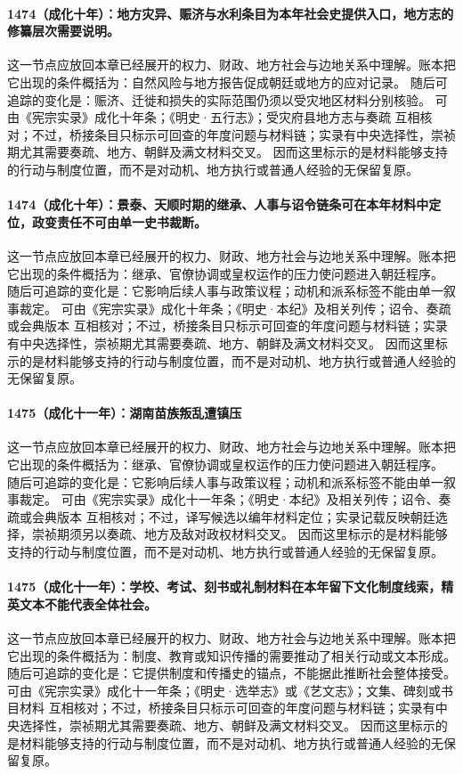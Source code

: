 \paragraph{1474（成化十年）：地方灾异、赈济与水利条目为本年社会史提供入口，地方志的修纂层次需要说明。} 这一节点应放回本章已经展开的权力、财政、地方社会与边地关系中理解。账本把它出现的条件概括为：自然风险与地方报告促成朝廷或地方的应对记录。 随后可追踪的变化是：赈济、迁徙和损失的实际范围仍须以受灾地区材料分别核验。 可由《宪宗实录》成化十年条；《明史·五行志》；受灾府县地方志与奏疏 互相核对；不过，桥接条目只标示可回查的年度问题与材料链；实录有中央选择性，崇祯期尤其需要奏疏、地方、朝鲜及满文材料交叉。 因而这里标示的是材料能够支持的行动与制度位置，而不是对动机、地方执行或普通人经验的无保留复原。

\paragraph{1474（成化十年）：景泰、天顺时期的继承、人事与诏令链条可在本年材料中定位，政变责任不可由单一史书裁断。} 这一节点应放回本章已经展开的权力、财政、地方社会与边地关系中理解。账本把它出现的条件概括为：继承、官僚协调或皇权运作的压力使问题进入朝廷程序。 随后可追踪的变化是：它影响后续人事与政策议程；动机和派系标签不能由单一叙事裁定。 可由《宪宗实录》成化十年条；《明史·本纪》及相关列传；诏令、奏疏或会典版本 互相核对；不过，桥接条目只标示可回查的年度问题与材料链；实录有中央选择性，崇祯期尤其需要奏疏、地方、朝鲜及满文材料交叉。 因而这里标示的是材料能够支持的行动与制度位置，而不是对动机、地方执行或普通人经验的无保留复原。

\paragraph{1475（成化十一年）：湖南苗族叛乱遭镇压} 这一节点应放回本章已经展开的权力、财政、地方社会与边地关系中理解。账本把它出现的条件概括为：继承、官僚协调或皇权运作的压力使问题进入朝廷程序。 随后可追踪的变化是：它影响后续人事与政策议程；动机和派系标签不能由单一叙事裁定。 可由《宪宗实录》成化十一年条；《明史·本纪》及相关列传；诏令、奏疏或会典版本 互相核对；不过，译写候选以编年材料定位；实录记载反映朝廷选择，崇祯期须另以奏疏、地方及敌对政权材料交叉。 因而这里标示的是材料能够支持的行动与制度位置，而不是对动机、地方执行或普通人经验的无保留复原。

\paragraph{1475（成化十一年）：学校、考试、刻书或礼制材料在本年留下文化制度线索，精英文本不能代表全体社会。} 这一节点应放回本章已经展开的权力、财政、地方社会与边地关系中理解。账本把它出现的条件概括为：制度、教育或知识传播的需要推动了相关行动或文本形成。 随后可追踪的变化是：它提供制度和传播史的锚点，不能据此推断社会整体接受。 可由《宪宗实录》成化十一年条；《明史·选举志》或《艺文志》；文集、碑刻或书目材料 互相核对；不过，桥接条目只标示可回查的年度问题与材料链；实录有中央选择性，崇祯期尤其需要奏疏、地方、朝鲜及满文材料交叉。 因而这里标示的是材料能够支持的行动与制度位置，而不是对动机、地方执行或普通人经验的无保留复原。

